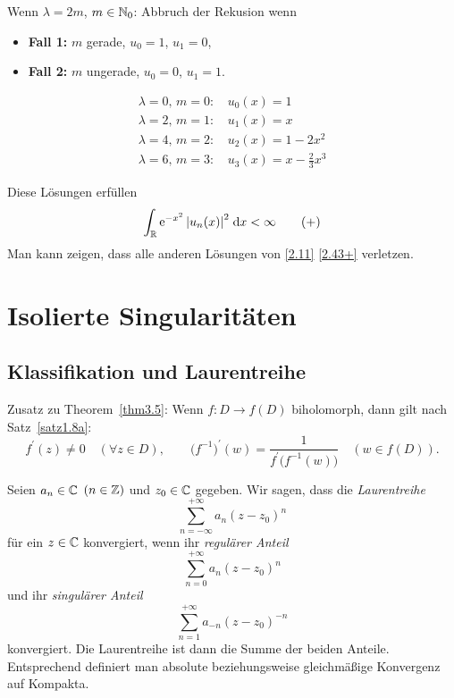 \documentclass[a4paper,twoside,DIV15,BCOR12mm]{scrbook}
\begin{document}
\begin{bsp}
Wenn $\lambda=2m$, $m\in\mathbb{N}_0$: Abbruch der Rekusion wenn
\begin{itemize}
\item[] \textbf{Fall 1:} $m$ gerade, $u_0=1$, $u_1=0$,
\item[] \textbf{Fall 2:} $m$ ungerade, $u_0=0$, $u_1=1$.
\end{itemize}

\vspace*{-16pt}
\begin{align*}
\lambda=0,\,m=0\colon\,&u_0(x)=1\\
\lambda=2,\,m=1\colon\,&u_1(x)=x\\
\lambda=4,\,m=2\colon\,&u_2(x)=1-2x^2\\
\lambda=6,\,m=3\colon\,&u_3(x)=x-\frac{2}{3}x^3
\end{align*}

Diese Lösungen erfüllen
\[\label{2.43+}\int_{\mathbb{R}}^{}{\mathrm{e}^{-x^2}\left\lvert u_n(x)\right\lvert^2}\;\mathrm{d} x<\infty\tag{+}\]
Man kann zeigen, dass alle anderen Lösungen von \eqref{2.11} \eqref{2.43+} verletzen.
\end{bsp}


\chapter{Isolierte Singularitäten}

\section{Klassifikation und Laurentreihe}

Zusatz zu Theorem~\ref{thm3.5}: Wenn $f\colon D\to f(D)$ biholomorph, dann gilt nach Satz~\ref{satz1.8a}:
\[f^\prime(z)\neq 0\quad(\forall z\in D),\qquad\bigl(f^{-1}\bigr)^\prime(w)=\frac{1}{f^\prime\bigl(f^{-1}(w)\bigr)}\quad(w\in f(D)).\]

Seien $a_n\in\mathbb{C}$ $(n\in\mathbb{Z})$ und $z_0\in\mathbb{C}$ gegeben. Wir sagen, dass die \textit{Laurentreihe}
\[\sum_{n=-\infty}^{+\infty}a_n(z-z_0)^n\]
für ein $z\in\mathbb{C}$ konvergiert, wenn ihr \textit{regulärer Anteil}
\[\sum_{n=0}^{+\infty}a_n(z-z_0)^n\]
und ihr \textit{singulärer Anteil}
\[\sum_{n=1}^{+\infty}a_{-n}(z-z_0)^{-n}\]
konvergiert. Die Laurentreihe ist dann die Summe der beiden Anteile. Entsprechend definiert man absolute beziehungsweise gleichmäßige Konvergenz auf Kompakta.
\end{document}

